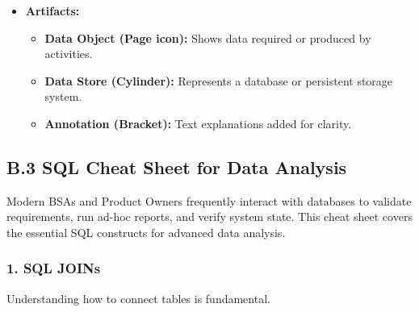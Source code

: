 \documentclass[
  11pt,
  openany,
  oneside]{book}
\providecommand{\tightlist}{%
  \setlength{\itemsep}{0pt}\setlength{\parskip}{0pt}}
\begin{document}
\begin{itemize}
  \begin{itemize}
  \tightlist
  \item
    \textbf{Pool:} Represents a major participant (e.g., an organization
    or a distinct system).
  \item
    \textbf{Lane:} Sub-partitions within a pool representing specific
    roles or departments (e.g., ``Sales,'' ``Finance'').
  \end{itemize}
\item
  \textbf{Artifacts:}

  \begin{itemize}
  \tightlist
  \item
    \textbf{Data Object (Page icon):} Shows data required or produced by
    activities.
  \item
    \textbf{Data Store (Cylinder):} Represents a database or persistent
    storage system.
  \item
    \textbf{Annotation (Bracket):} Text explanations added for clarity.
  \end{itemize}
\end{itemize}

\bigskip

\subsection{B.3 SQL Cheat Sheet for Data
Analysis}\label{b.3-sql-cheat-sheet-for-data-analysis}

Modern BSAs and Product Owners frequently interact with databases to
validate requirements, run ad-hoc reports, and verify system state. This
cheat sheet covers the essential SQL constructs for advanced data
analysis.

\subsubsection{1. SQL JOINs}\label{sql-joins}

Understanding how to connect tables is fundamental.
\end{document}
